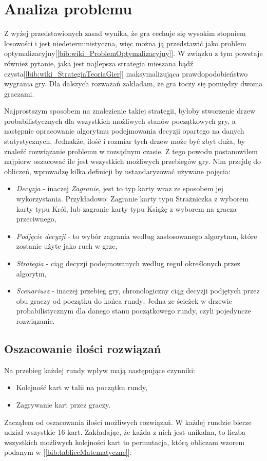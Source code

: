 \section{Analiza problemu}
\label{sec:opisProblemu}
Z wyżej przedstawionych zasad wynika, że gra cechuje się wysokim stopniem losowości i jest niedeterministyczna, więc można ją przedstawić jako problem optymalizacyjny[\ref{bib:wiki_ProblemOptymalizacyjny}]. W związku z tym powstaje również pytanie, jaka jest najlepsza strategia mieszana bądź czysta[\ref{bib:wiki_StrategiaTeoriaGier}] maksymalizująca prawdopodobieństwo wygrania gry. Dla dalszych rozważań zakładam, że gra toczy się pomiędzy dwoma graczami.

Najprostszym sposobem na znalezienie takiej strategii, byłoby stworzenie drzew probabilistycznych dla wszystkich możliwych stanów początkowych gry, a następnie opracowanie algorytmu podejmowania decyzji opartego na danych statystycznych. Jednakże, ilość i rozmiar tych drzew może być zbyt duża, by znaleźć rozwiązanie problemu w rozsądnym czasie. Z tego powodu postanowiłem najpierw oszacować ile jest wszystkich możliwych przebiegów gry. Nim przejdę do obliczeń, wprowadzę kilka definicji by ustandaryzować używane pojęcia:
\begin{itemize}
	\item \textit{Decyzja} - inaczej \textit{Zagranie}, jest to typ karty wraz ze sposobem jej wykorzystania. Przykładowo: Zagranie karty typu Strażniczka z wyborem karty typu Król, lub zagranie karty typu Książę z wyborem na gracza przeciwnego,
	\item \textit{Podjęcie decyzji} - to wybór zagrania według zastosowanego algorytmu, które zostanie użyte jako ruch w grze,
	\item \textit{Strategia} - ciąg decyzji podejmowanych według reguł określonych przez algorytm,
	\item \textit{Scenariusz} - inaczej przebieg gry, chronologiczny ciąg decyzji podjętych przez obu graczy od początku do końca rundy; Jedna ze ścieżek w drzewie probabilistycznym dla danego stanu początkowego rundy, czyli pojedyncze rozwiązanie.
\end{itemize}

\subsection*{Oszacowanie ilości rozwiązań}
Na przebieg każdej rundy wpływ mają następujące czynniki:
\begin{itemize}
	\item Kolejność kart w talii na początku rundy,
	\item Zagrywanie kart przez graczy.
\end{itemize}
Zacząłem od oszacowania ilości możliwych rozwiązań. W każdej rundzie bierze udział wszystkie 16 kart. Zakładając, że każda z nich jest unikalna, to  liczba wszystkich możliwych kolejności kart to permutacja, którą obliczam wzorem podanym w [\ref{bib:tabliceMatematyczne}]:

